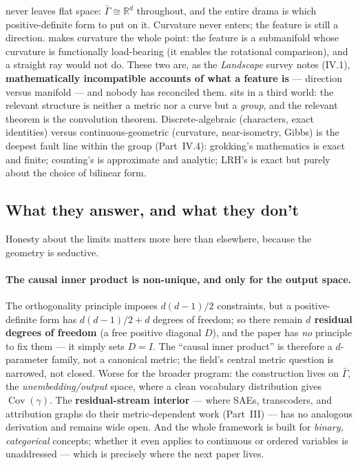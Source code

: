 \textcite{linear-representation-hypothesis-geometry} never leaves flat space: $\bar\Gamma\cong\mathbb{R}^d$ throughout, and the entire drama is which positive-definite form to put on it. Curvature never enters; the feature is still a direction. \textcite{when-models-manipulate-manifolds-counting} makes curvature the whole point: the feature is a submanifold whose curvature is functionally load-bearing (it enables the rotational comparison), and a straight ray would not do. These two are, as the \emph{Landscape} survey notes (IV.1), \textbf{mathematically incompatible accounts of what a feature is} --- direction versus manifold --- and nobody has reconciled them. \textcite{progress-measures-for-grokking} sits in a third world: the relevant structure is neither a metric nor a curve but a \emph{group}, and the relevant theorem is the convolution theorem. Discrete-algebraic (characters, exact identities) versus continuous-geometric (curvature, near-isometry, Gibbs) is the deepest fault line within the group (Part~IV.4): grokking's mathematics is exact and finite; counting's is approximate and analytic; LRH's is exact but purely about the choice of bilinear form.


\subsection*{What they answer, and what they don't}

Honesty about the limits matters more here than elsewhere, because the geometry is seductive.

\paragraph*{The causal inner product is non-unique, and only for the output space.}
The orthogonality principle imposes $d(d-1)/2$ constraints, but a positive-definite form has $d(d-1)/2+d$ degrees of freedom; so there remain \textbf{$d$ residual degrees of freedom} (a free positive diagonal $D$), and the paper has \emph{no} principle to fix them --- it simply sets $D=I$. The ``causal inner product'' is therefore a $d$-parameter family, not a canonical metric; the field's central metric question is narrowed, not closed. Worse for the broader program: the construction lives on $\bar\Gamma$, the \emph{unembedding/output} space, where a clean vocabulary distribution gives $\operatorname{Cov}(\gamma)$. The \textbf{residual-stream interior} --- where SAEs, transcoders, and attribution graphs do their metric-dependent work (Part~III) --- has no analogous derivation and remains wide open. And the whole framework is built for \emph{binary, categorical} concepts; whether it even applies to continuous or ordered variables is unaddressed --- which is precisely where the next paper lives.

